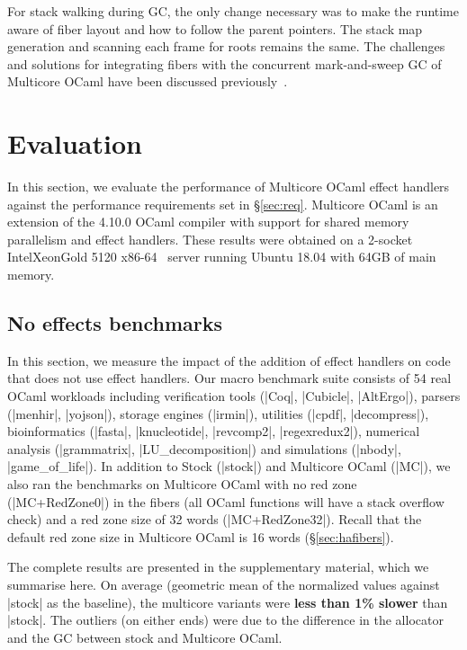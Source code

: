 \documentclass[sigplan,10pt,review,anonymous]{acmart}\settopmatter{printfolios=true,printccs=false,printacmref=false}
\begin{document}
For stack walking during GC, the only change necessary was to make the runtime
aware of fiber layout and how to follow the parent pointers. The stack map
generation and scanning each frame for roots remains the same. The
challenges and solutions for integrating fibers with the concurrent
mark-and-sweep GC of Multicore OCaml have been discussed previously~\cite{Sivaramakrishnan20}.

\vspace{-2mm}
\section{Evaluation}
\label{sec:eval}

In this section, we evaluate the performance of Multicore OCaml effect handlers
against the performance requirements set in \S\ref{sec:req}. Multicore OCaml is
an extension of the 4.10.0 OCaml compiler with support for shared memory
parallelism and effect handlers. These results were obtained on a 2-socket
Intel\textregistered Xeon\textregistered Gold 5120
x86-64~\cite{IntelXeonGold5120Spec} server running Ubuntu 18.04 with 64GB of main
memory.

\vspace{-3mm}
\subsection{No effects benchmarks}

In this section, we measure the impact of the addition of effect handlers on
code that does not use effect handlers. Our macro benchmark suite consists of
54 real OCaml workloads including verification tools (|Coq|, |Cubicle|,
|AltErgo|), parsers (|menhir|, |yojson|), storage engines (|irmin|), utilities
(|cpdf|, |decompress|), bioinformatics (|fasta|, |knucleotide|, |revcomp2|,
|regexredux2|), numerical analysis (|grammatrix|, |LU_decomposition|) and
simulations (|nbody|, |game_of_life|). In addition to Stock (|stock|) and
Multicore OCaml (|MC|), we also ran the benchmarks on Multicore OCaml with no
red zone (|MC+RedZone0|) in the fibers (all OCaml functions will have a stack
overflow check) and a red zone size of 32 words (|MC+RedZone32|). Recall that
the default red zone size in Multicore OCaml is 16 words (\S\ref{sec:hafibers}).

The complete results are presented in the supplementary material, which we
summarise here. On average (geometric mean of the normalized values against
|stock| as the baseline), the multicore variants were \textbf{less than 1\%
slower} than |stock|. The outliers (on either ends) were due to the difference
in the allocator and the GC between stock and Multicore OCaml.
\end{document}
